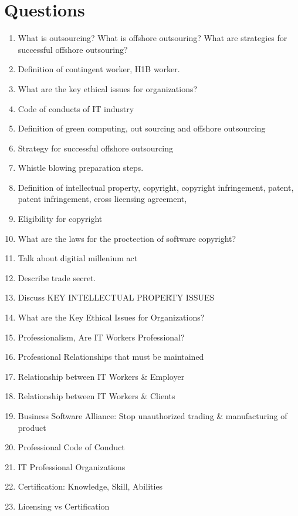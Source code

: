 \documentclass[11pt]{article}
\begin{document}
\section{Questions}
\label{sec:org3832d74}
\begin{enumerate}
\item What is outsourcing? What is offshore outsouring? What are strategies for successful offshore outsouring?
\item Definition of contingent worker, H1B worker.
\item What are the key ethical issues for organizations?
\item Code of conducts of IT industry
\item Definition of green computing, out sourcing and offshore outsourcing
\item Strategy for successful offshore outsourcing
\item Whistle blowing preparation steps.
\item Definition of intellectual property, copyright, copyright infringement, patent, patent infringement, cross licensing agreement,
\item Eligibility for copyright
\item What are the laws for the proctection of software copyright?
\item Talk about digitial millenium act
\item Describe trade secret.
\item Discuss KEY INTELLECTUAL PROPERTY ISSUES
\item What are the Key Ethical Issues for Organizations?
\item Professionalism, Are IT Workers Professional?
\item Professional Relationships that must be maintained
\item Relationship between IT Workers \& Employer
\item Relationship between IT Workers \& Clients
\item Business Software Alliance: Stop unauthorized trading \& manufacturing of product
\item Professional Code of Conduct
\item IT Professional Organizations
\item Certification: Knowledge, Skill, Abilities
\item Licensing vs Certification
\end{enumerate}
\end{document}
